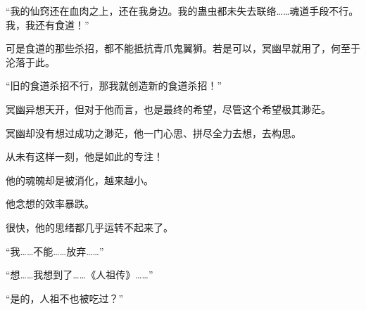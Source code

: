 \begin{this_body}
“我的仙窍还在血肉之上，还在我身边。我的蛊虫都未失去联络……魂道手段不行。我，我还有食道！”

可是食道的那些杀招，都不能抵抗青爪鬼翼狮。若是可以，冥幽早就用了，何至于沦落于此。

“旧的食道杀招不行，那我就创造新的食道杀招！”

冥幽异想天开，但对于他而言，也是最终的希望，尽管这个希望极其渺茫。

冥幽却没有想过成功之渺茫，他一门心思、拼尽全力去想，去构思。

从未有这样一刻，他是如此的专注！

他的魂魄却是被消化，越来越小。

他念想的效率暴跌。

很快，他的思绪都几乎运转不起来了。

“我……不能……放弃……”

“想……我想到了……《人祖传》……”

“是的，人祖不也被吃过？”

\end{this_body}

